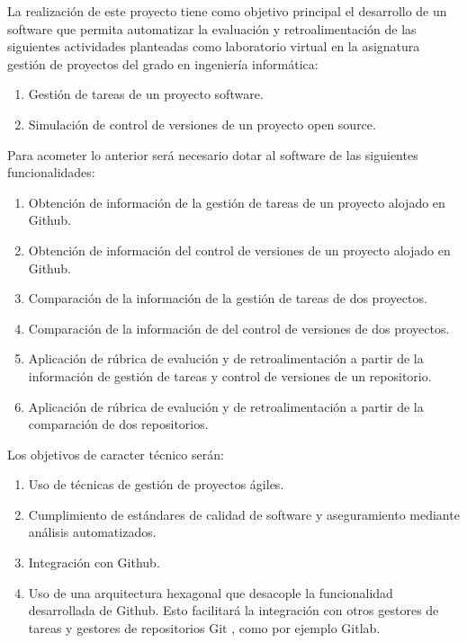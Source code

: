 
La realización de este proyecto tiene como objetivo principal el desarrollo de un software que permita automatizar la evaluación y retroalimentación de las siguientes actividades planteadas como laboratorio virtual en la asignatura gestión de proyectos del grado en ingeniería informática:

\begin{enumerate}
	\item Gestión de tareas de un proyecto software. 
	\item Simulación de control de versiones de un proyecto open source.
\end{enumerate}

Para acometer lo anterior será necesario dotar al software de las siguientes funcionalidades:

\begin{enumerate}
	\item Obtención de información de la gestión de tareas de un proyecto alojado en Github.	
	\item Obtención de información del control de versiones de un proyecto alojado en Github.
	\item Comparación de la información de la gestión de tareas de dos proyectos.
	\item Comparación de la información de del control de versiones de dos proyectos.			
	\item Aplicación de rúbrica de evalución y de retroalimentación a partir de la información de gestión de tareas y control de versiones de un repositorio.
	\item Aplicación de rúbrica de evalución y de retroalimentación a partir de la comparación de dos repositorios.	 		  
\end{enumerate}

Los objetivos de caracter técnico serán:

\begin{enumerate}
	\item Uso de técnicas de gestión de proyectos ágiles.
	\item Cumplimiento de estándares de calidad de software y aseguramiento mediante análisis automatizados.
	\item Integración con Github. 
	\item Uso de una arquitectura hexagonal que desacople la funcionalidad desarrollada de Github. Esto facilitará la  integración con otros gestores de tareas y gestores de repositorios Git , como por ejemplo Gitlab.
\end{enumerate}

